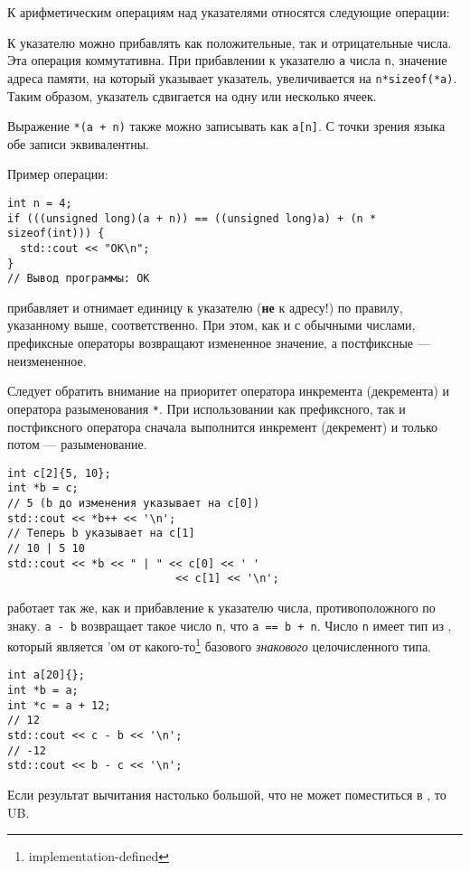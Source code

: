 К арифметическим операциям над указателями относятся следующие операции:
\begin{enumerate}
   К указателю можно прибавлять как положительные,
  так и отрицательные числа. Эта операция коммутативна. При прибавлении к указателю
  \verb|a| числа \verb|n|, значение адреса памяти, на который указывает указатель,
  увеличивается на \verb|n*sizeof(*a)|. Таким образом, указатель сдвигается на одну или
  несколько ячеек.

  Выражение \verb|*(a + n)| также можно записывать как \verb|a[n]|.
  С точки зрения языка обе записи эквивалентны.
  
  Пример операции:
\begin{verbatim}
int n = 4;
if (((unsigned long)(a + n)) == ((unsigned long)a) + (n * sizeof(int))) {
  std::cout << "OK\n";
}
// Вывод программы: OK
\end{verbatim}

   прибавляет и отнимает единицу к указателю (\textbf{не} к адресу!) по правилу, указанному
  выше, соответственно. При этом, как и с обычными числами, префиксные операторы возвращают измененное
  значение, а постфиксные --- неизмененное.

  Следует обратить внимание на приоритет оператора инкремента (декремента)
  и оператора разыменования \verb|*|. При использовании как префиксного, так и постфиксного
  оператора сначала выполнится инкремент (декремент) и только потом --- разыменование.
\begin{verbatim}
int c[2]{5, 10};
int *b = c;
// 5 (b до изменения указывает на c[0])
std::cout << *b++ << '\n';
// Теперь b указывает на c[1]
// 10 | 5 10
std::cout << *b << " | " << c[0] << ' '
                          << c[1] << '\n';
\end{verbatim}

   работает так же, как и прибавление к указателю
  числа, противоположного по знаку.
   \verb|a - b| возвращает такое число \verb|n|,
  что \verb|a == b + n|. Число \verb|n| имеет тип  из ,
  который является 'ом от какого-то\footnote{implementation-defined} базового
  \textit{знакового} целочисленного типа.
\begin{verbatim}
int a[20]{};
int *b = a;
int *c = a + 12;
// 12
std::cout << c - b << '\n';
// -12
std::cout << b - c << '\n';
\end{verbatim}
  Если результат вычитания настолько большой, что не может поместиться в ,
  то UB.
\end{enumerate}

